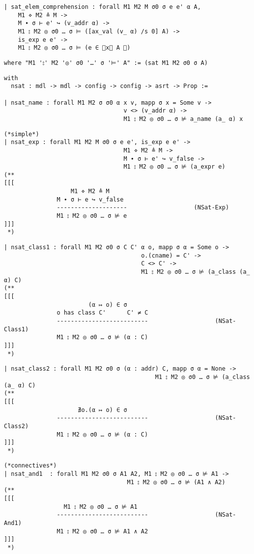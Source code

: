 \documentclass[12pt]{article}
\begin{document}
\begin{verbatim}
| sat_elem_comprehension : forall M1 M2 M σ0 σ e e' α A,
    M1 ⋄ M2 ≜ M ->
    M ∙ σ ⊢ e' ↪ (v_addr α) ->
    M1 ⦂ M2 ◎ σ0 … σ ⊨ ([ax_val (v_ α) /s 0] A) ->
    is_exp e e' ->
    M1 ⦂ M2 ◎ σ0 … σ ⊨ (e ∈ ⦃x⃒ A ⦄)
\end{verbatim}
\begin{verbatim}
where "M1 '⦂' M2 '◎' σ0 '…' σ '⊨' A" := (sat M1 M2 σ0 σ A)
\end{verbatim}
\begin{verbatim}
with
  nsat : mdl -> mdl -> config -> config -> asrt -> Prop :=

| nsat_name : forall M1 M2 σ σ0 α x v, mapp σ x = Some v ->
                                  v <> (v_addr α) ->
                                  M1 ⦂ M2 ◎ σ0 … σ ⊭ a_name (a_ α) x
\end{verbatim}
\begin{verbatim}
(*simple*)
| nsat_exp : forall M1 M2 M σ0 σ e e', is_exp e e' ->
                                  M1 ⋄ M2 ≜ M ->
                                  M ∙ σ ⊢ e' ↪ v_false ->
                                  M1 ⦂ M2 ◎ σ0 … σ ⊭ (a_expr e)
(**
[[[
                   M1 ⋄ M2 ≜ M
               M ∙ σ ⊢ e ↪ v_false
               --------------------                   (NSat-Exp)
               M1 ⦂ M2 ◎ σ0 … σ ⊭ e
]]]
 *)
\end{verbatim}
\begin{verbatim}
| nsat_class1 : forall M1 M2 σ0 σ C C' α o, mapp σ α = Some o -> 
                                       o.(cname) = C' ->
                                       C <> C' ->
                                       M1 ⦂ M2 ◎ σ0 … σ ⊭ (a_class (a_ α) C)
(**
[[[
                        (α ↦ o) ∈ σ     
               o has class C'      C' ≠ C
               --------------------------                   (NSat-Class1)
               M1 ⦂ M2 ◎ σ0 … σ ⊭ (α : C)
]]]
 *)
\end{verbatim}
\begin{verbatim}
| nsat_class2 : forall M1 M2 σ0 σ (α : addr) C, mapp σ α = None ->
                                           M1 ⦂ M2 ◎ σ0 … σ ⊭ (a_class (a_ α) C)
(**
[[[
                     ∄o.(α ↦ o) ∈ σ
               --------------------------                   (NSat-Class2)
               M1 ⦂ M2 ◎ σ0 … σ ⊭ (α : C)
]]]
 *)
\end{verbatim}
\begin{verbatim}
(*connectives*)
| nsat_and1  : forall M1 M2 σ0 σ A1 A2, M1 ⦂ M2 ◎ σ0 … σ ⊭ A1 ->
                                   M1 ⦂ M2 ◎ σ0 … σ ⊭ (A1 ∧ A2)
(**
[[[
                 M1 ⦂ M2 ◎ σ0 … σ ⊭ A1
               --------------------------                   (NSat-And1)
               M1 ⦂ M2 ◎ σ0 … σ ⊭ A1 ∧ A2
]]]
 *)
\end{verbatim}
\end{document}
